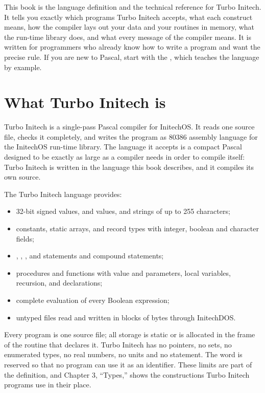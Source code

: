 \IntroductionChapter

This book is the language definition and the technical reference for Turbo
Initech\reg{}.  It tells you exactly which programs Turbo Initech accepts,
what each construct means, how the compiler lays out your data and your
routines in memory, what the run-time library does, and what every message
of the compiler means.  It is written for programmers who already know how
to write a program and want the precise rule.  If you are new to Pascal,
start with the , which teaches the language by
example.

\section{What Turbo Initech is}
Turbo Initech is a single-pass Pascal compiler for InitechOS.  It reads one
source file, checks it completely, and writes the program as 80386
assembly language for the InitechOS run-time library.  The language it
accepts is a compact Pascal designed to be exactly as large as a compiler
needs in order to compile itself: Turbo Initech is written in the language
this book describes, and it compiles its own source.

The Turbo Initech language provides:
\begin{itemize}
\item 32-bit signed  values,  and  values,
  and strings of up to 255 characters;
\item constants, static arrays, and record types with integer, boolean and
  character fields;
\item {}, , , and  statements and
  compound statements;
\item procedures and functions with value and  parameters, local
  variables, recursion, and  declarations;
\item complete evaluation of every Boolean expression;
\item untyped files read and written in blocks of bytes through InitechDOS.
\end{itemize}

Every program is one source file; all storage is static or is allocated in
the frame of the routine that declares it.  Turbo Initech has no pointers,
no sets, no enumerated types, no real numbers, no units and no 
statement.  The word  is reserved so that no program can use it as
an identifier.  These limits are part of the definition, and Chapter 3,
``Types,'' shows the constructions Turbo Initech programs use in their
place.


